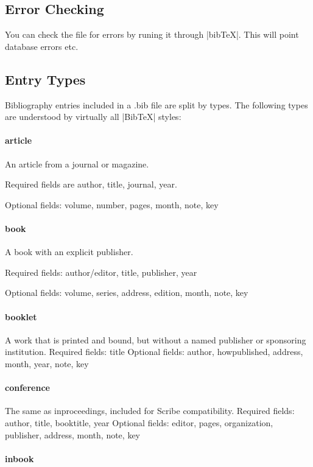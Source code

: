 \begin{refsection}
\section{Error Checking}

You can check the file for errors by runing it through |bibTeX|. This will point database errors etc. 


\subsection{Entry Types}

Bibliography entries included in a .bib file are split by types. The following types are understood by virtually all |BibTeX| styles:

\paragraph{article} An article from a journal or magazine. 
  
  Required fields are author, title, journal, year.
  
  Optional fields: volume, number, pages, month, note, key

\paragraph{book}
   A book with an explicit publisher.
   
   Required fields: author/editor, title, publisher, year
   
   Optional fields: volume, series, address, edition, month, note, key

\paragraph{booklet}
   A work that is printed and bound, but without a named publisher or sponsoring institution.
   Required fields: title
   Optional fields: author, howpublished, address, month, year, note, key

\paragraph{conference}
   The same as inproceedings, included for Scribe compatibility.
   Required fields: author, title, booktitle, year
   Optional fields: editor, pages, organization, publisher, address, month, note, key

\paragraph{inbook}


\end{refsection}
